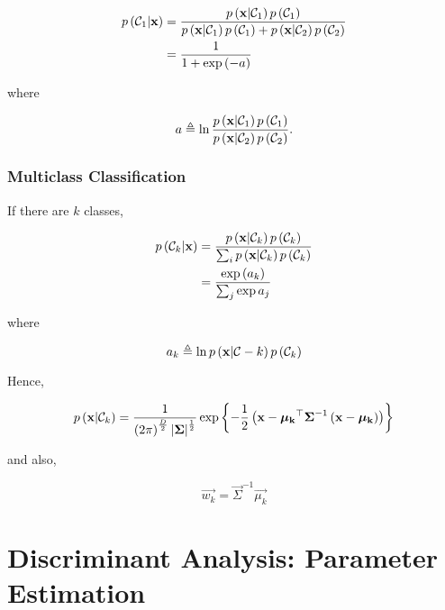 \documentclass[twoside]{article}
\begin{document}
\begin{align} 
    p\left(\mathcal C_1|\boldsymbol{\mathbf{x}}\right) &= \frac{p\left(\boldsymbol{\mathbf{x}}|\mathcal C_1\right)p\left(\mathcal C_1\right)}{p\left(\boldsymbol{\mathbf{x}}|\mathcal C_1\right)p\left(\mathcal C_1\right) + p\left(\boldsymbol{\mathbf{x}}|\mathcal C_2\right)p\left(\mathcal C_2\right)} \\
                          &= \frac{1}{1 + \exp\left(-a\right)}
    \label{eq:gen-sigmoid} 
\end{align}

where

\begin{equation}
    a \triangleq \ln\frac{p\left(\boldsymbol{\mathbf{x}}|\mathcal C_1\right)p\left(\mathcal C_1\right)}{p\left(\boldsymbol{\mathbf{x}}|\mathcal C_2\right)p\left(\mathcal C_2\right)}.
    \label{eq:a-sigmoid-def}
\end{equation}

\subsubsection{Multiclass Classification}
If there are \(k\) classes,

\begin{align} 
    p\left(\mathcal C_k|\boldsymbol{\mathbf{x}}\right) &= \frac{p\left(\boldsymbol{\mathbf{x}}|\mathcal C_k\right)p\left(\mathcal C_k\right)}{\sum_i
    p\left(\boldsymbol{\mathbf{x}}|\mathcal C_k\right)p\left(\mathcal C_k\right)} \\ &=
    \frac{\exp\left(a_k\right)}{\sum_j\exp{a_j}} 
    \label{eq:gen-softmax}
\end{align}

where

\begin{equation}
    a_k \triangleq \ln p\left(\boldsymbol{\mathbf{x}}|\mathcal C-k\right)p\left(\mathcal C_k\right)
    \label{eq:ak-softmax-def}
\end{equation}

Hence,

\begin{equation}
    p\left(\boldsymbol{\mathbf{x}}|\mathcal C_k\right) = \frac{1}{\left(2\pi\right)^{\frac{D}{2}}\left\vert\boldsymbol{\mathbf{\Sigma}}\right\vert^{\frac{1}{2}}}\exp\left\{-\frac{1}{2}\left(\boldsymbol{\mathbf{x}}-\boldsymbol{\mathbf{\mu_k}}^\top\boldsymbol{\mathbf{\Sigma}}^{-1}\left(\boldsymbol{\mathbf{x}}-\boldsymbol{\mathbf{\mu_k}}\right)\right)\right\}
    \label{eq:bayes-norm}
\end{equation}

and also,

\begin{equation}
    \vec{w_k} = \vec{\Sigma}^{-1}\vec{\mu_k}
    \label{eq:w-k-def}
\end{equation}

\section{Discriminant Analysis: Parameter Estimation}
\end{document}
